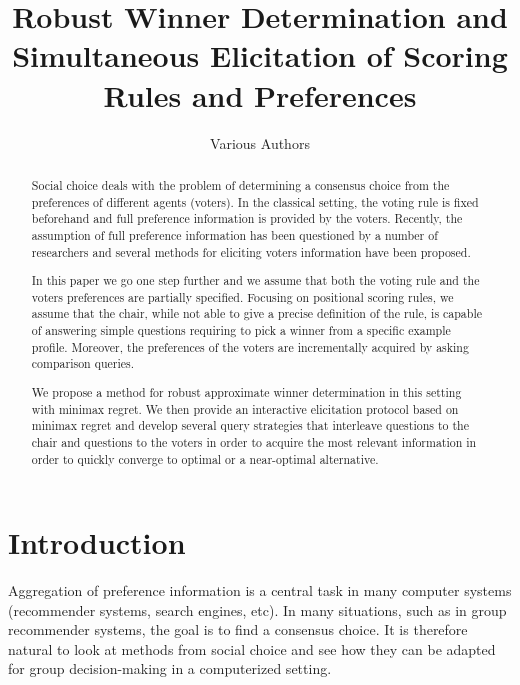 \documentclass[12pt]{article}
\author{Various Authors}
\title{Robust Winner Determination and Simultaneous Elicitation of Scoring Rules and Preferences}
\begin{document}
\maketitle

\begin{abstract}
Social choice deals with the problem of determining a consensus choice from the preferences of different agents (voters).
In the classical setting, the voting rule is fixed beforehand and full preference information is provided by the voters. 
Recently, the assumption of full preference information has been questioned by a number of researchers and several methods for eliciting voters information have been proposed.

In this paper we go one step further and we assume that both the voting rule and the voters preferences are partially specified.
Focusing on positional scoring rules, we assume that the chair, while  not able to give a precise definition of the rule, is capable of answering simple questions  requiring to pick a winner from a specific  example profile.
Moreover, the preferences of the voters are incrementally acquired by asking comparison queries.

We propose a method  for robust approximate winner determination in this setting with minimax regret. 
We then provide an interactive elicitation protocol based on minimax regret
and develop several query strategies that interleave questions to the chair and questions to the voters in order to acquire the most relevant information in order to quickly converge to optimal or a near-optimal alternative.
\end{abstract}

\section{Introduction}


Aggregation of preference information is a central task in many computer systems (recommender systems, search engines, etc).
In many situations, such as in group recommender systems, the goal is to find a consensus choice.
It is therefore natural to look at methods from social choice and see how they can be adapted for group decision-making in a computerized setting.
\end{document}
